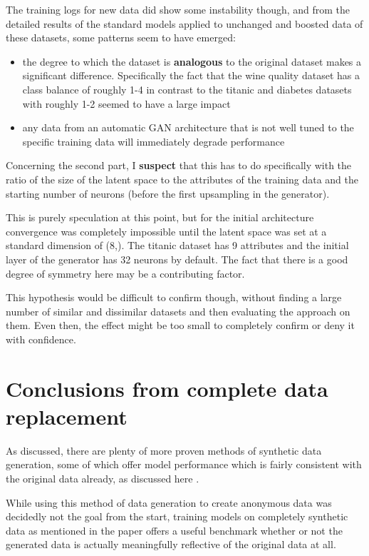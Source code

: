 The training logs for new data did show some instability though, and from the detailed results of the standard models applied to unchanged and boosted data of these datasets, some patterns seem to have emerged:

\begin{itemize}
	\item the degree to which the dataset is \textbf{analogous} to the original dataset makes a significant difference. Specifically the fact that the wine quality dataset has a class balance of roughly 1-4 in contrast to the titanic and diabetes datasets with roughly 1-2 seemed to have a large impact
	\item any data from an automatic \ac{GAN} architecture that is not well tuned to the specific training data will immediately degrade performance
\end{itemize} 

Concerning the second part, I \textbf{suspect} that this has to do specifically with the ratio of the size of the latent space to the attributes of the training data and the starting number of neurons (before the first upsampling in the generator).

This is purely speculation at this point, but for the initial architecture convergence was completely impossible until the latent space was set at a standard dimension of (8,). The titanic dataset has 9 attributes and the initial layer of the generator has 32 neurons by default. The fact that there is a good degree of symmetry here may be a contributing factor.

\label{note:hypothesis}

This hypothesis would be difficult to confirm though, without finding a large number of similar and dissimilar datasets and then evaluating the approach on them. Even then, the effect might be too small to completely confirm or deny it with confidence.

\pagebreak

\section{Conclusions from complete data replacement}

As discussed, there are plenty of more proven methods of synthetic data generation, some of which offer model performance which is fairly consistent with the original data already, as discussed here \cite{ares_utility}.

While using this method of data generation to create anonymous data was decidedly not the goal from the start, training models on completely synthetic data as mentioned in the paper offers a useful benchmark whether or not the generated data is actually meaningfully reflective of the original data at all. 

